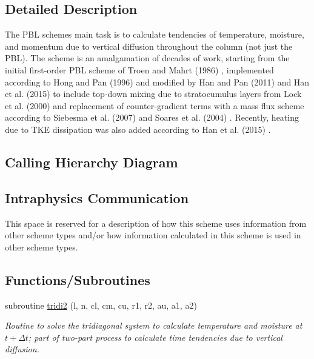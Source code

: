 \subsection{Detailed Description}
The P\+BL scheme\textquotesingle{}s main task is to calculate tendencies of temperature, moisture, and momentum due to vertical diffusion throughout the column (not just the P\+BL). The scheme is an amalgamation of decades of work, starting from the initial first-\/order P\+BL scheme of Troen and Mahrt (1986) \cite{troen_and_mahrt_1986}, implemented according to Hong and Pan (1996) \cite{hong_and_pan_1996} and modified by Han and Pan (2011) \cite{han_and_pan_2011} and Han et al. (2015) \cite{han_et_al_2015} to include top-\/down mixing due to stratocumulus layers from Lock et al. (2000) \cite{lock_et_al_2000} and replacement of counter-\/gradient terms with a mass flux scheme according to Siebesma et al. (2007) \cite{siebesma_et_al_2007} and Soares et al. (2004) \cite{soares_et_al_2004}. Recently, heating due to T\+KE dissipation was also added according to Han et al. (2015) \cite{han_et_al_2015}.\hypertarget{group___g_f_s___n_s_s_t_diagram}{}\subsection{Calling Hierarchy Diagram}\label{group___g_f_s___n_s_s_t_diagram}
 \hypertarget{group___g_f_s___n_s_s_t_intraphysics}{}\subsection{Intraphysics Communication}\label{group___g_f_s___n_s_s_t_intraphysics}
This space is reserved for a description of how this scheme uses information from other scheme types and/or how information calculated in this scheme is used in other scheme types. \subsection*{Functions/\+Subroutines}
\begin{DoxyCompactItemize}
\item 
subroutine \hyperlink{group___h_e_d_m_f_ga80bebdc639adaba3ed0ed2ea2f24315e}{tridi2} (l, n, cl, cm, cu, r1, r2, au, a1, a2)
\begin{DoxyCompactList}\small\item\em Routine to solve the tridiagonal system to calculate temperature and moisture at $ t + \Delta t $; part of two-\/part process to calculate time tendencies due to vertical diffusion. \end{DoxyCompactList}\end{DoxyCompactItemize}
